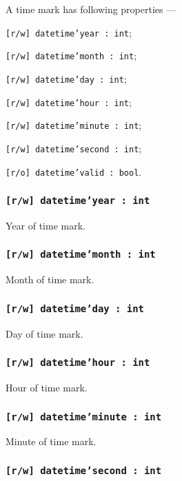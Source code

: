 A time mark has following properties —
\begin{icItems}
	\item \texttt{[r/w] datetime'year : int};
	\item \texttt{[r/w] datetime'month : int};
	\item \texttt{[r/w] datetime'day : int};
	\item \texttt{[r/w] datetime'hour : int};
	\item \texttt{[r/w] datetime'minute : int};
	\item \texttt{[r/w] datetime'second : int};
	\item \texttt{[r/o] datetime'valid : bool}.
\end{icItems}

\subsubsection{\texttt{[r/w] datetime'year : int}}

Year of time mark.

\subsubsection{\texttt{[r/w] datetime'month : int}}

Month of time mark.

\subsubsection{\texttt{[r/w] datetime'day : int}}

Day of time mark.

\subsubsection{\texttt{[r/w] datetime'hour : int}}

Hour of time mark.

\subsubsection{\texttt{[r/w] datetime'minute : int}}

Minute of time mark.

\subsubsection{\texttt{[r/w] datetime'second : int}}

